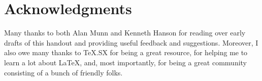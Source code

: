 
\section{Acknowledgments}
\label{sec:acknowledgments}

Many thanks to both Alan Munn and Kenneth Hanson for reading over early drafts of this handout and providing useful feedback and suggestions.
Moreover, I also owe many thanks to TeX.SX for being a great resource, for helping me to learn a lot about \LaTeX, and, most importantly, for being a great community consisting of a bunch of friendly folks. \resizebox*{!}{1em}{\rubberduck}